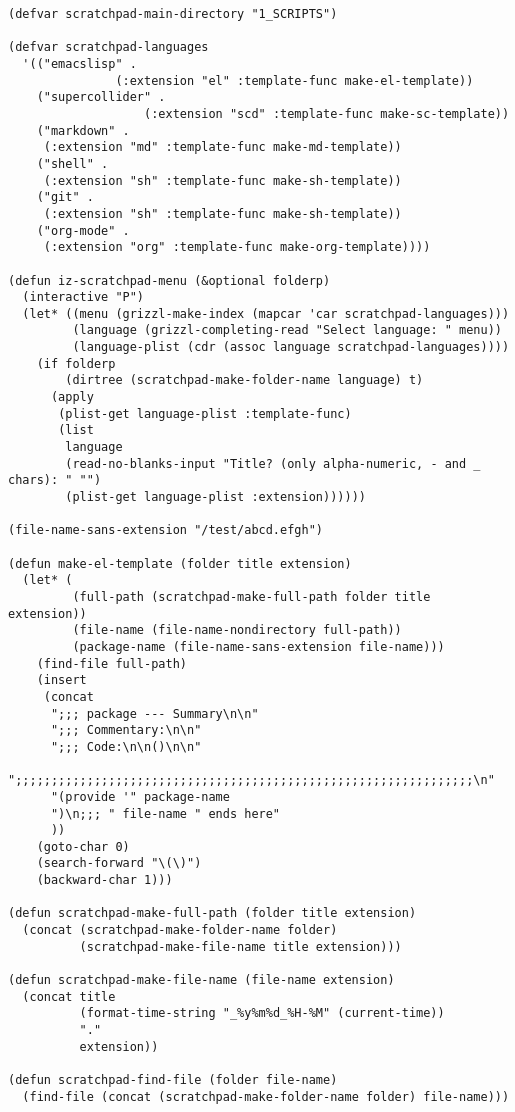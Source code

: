 \documentclass{article}
\begin{document}
\begin{verbatim}
(defvar scratchpad-main-directory "1_SCRIPTS")

(defvar scratchpad-languages
  '(("emacslisp" .
               (:extension "el" :template-func make-el-template))
    ("supercollider" .
                   (:extension "scd" :template-func make-sc-template))
    ("markdown" .
     (:extension "md" :template-func make-md-template))
    ("shell" .
     (:extension "sh" :template-func make-sh-template))
    ("git" .
     (:extension "sh" :template-func make-sh-template))
    ("org-mode" .
     (:extension "org" :template-func make-org-template))))

(defun iz-scratchpad-menu (&optional folderp)
  (interactive "P")
  (let* ((menu (grizzl-make-index (mapcar 'car scratchpad-languages)))
         (language (grizzl-completing-read "Select language: " menu))
         (language-plist (cdr (assoc language scratchpad-languages))))
    (if folderp
        (dirtree (scratchpad-make-folder-name language) t)
      (apply
       (plist-get language-plist :template-func)
       (list
        language
        (read-no-blanks-input "Title? (only alpha-numeric, - and _ chars): " "")
        (plist-get language-plist :extension))))))

(file-name-sans-extension "/test/abcd.efgh")

(defun make-el-template (folder title extension)
  (let* (
         (full-path (scratchpad-make-full-path folder title extension))
         (file-name (file-name-nondirectory full-path))
         (package-name (file-name-sans-extension file-name)))
    (find-file full-path)
    (insert
     (concat
      ";;; package --- Summary\n\n"
      ";;; Commentary:\n\n"
      ";;; Code:\n\n()\n\n"
      ";;;;;;;;;;;;;;;;;;;;;;;;;;;;;;;;;;;;;;;;;;;;;;;;;;;;;;;;;;;;;;;;\n"
      "(provide '" package-name
      ")\n;;; " file-name " ends here"
      ))
    (goto-char 0)
    (search-forward "\(\)")
    (backward-char 1)))

(defun scratchpad-make-full-path (folder title extension)
  (concat (scratchpad-make-folder-name folder)
          (scratchpad-make-file-name title extension)))

(defun scratchpad-make-file-name (file-name extension)
  (concat title
          (format-time-string "_%y%m%d_%H-%M" (current-time))
          "."
          extension))

(defun scratchpad-find-file (folder file-name)
  (find-file (concat (scratchpad-make-folder-name folder) file-name)))


\end{verbatim}
\end{document}
